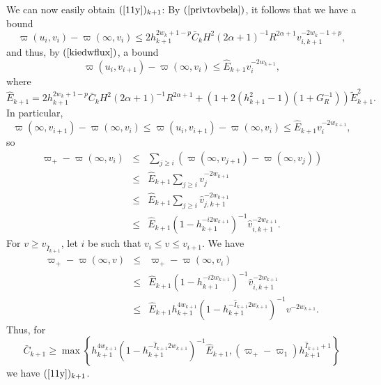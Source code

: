 \documentclass{article}
\begin{document}
We can now easily obtain $(\ref{11y})_{k+1}$:
By $(\ref{privtovbela})$, it follows that we have a bound
\[
\varpi(u_i,v_i)-\varpi(\infty,v_i)\le 
2h_{k+1}^{2w_k+1-p}\bar{C}_kH^2(2\alpha+1)^{-1}
R^{2\alpha+1}v_{i,k+1}^{-2w_k-1+p},
\]
and thus, by $(\ref{kiedwflux})$,
a bound
\begin{equation}
\label{giatoY}
\varpi(u_i,v_{i+1})-\varpi(\infty,v_i)
\le \hat{E}_{k+1} v_i^{-2w_{k+1}},
\end{equation}
where 
\[
\hat{E}_{k+1}=
2h_{k+1}^{2w_k+1-p}\bar{C}_kH^2(2\alpha+1)^{-1}
R^{2\alpha+1}+(1+2(h_{k+1}^2-1)(1+G_R^{-1}))
\tilde{E}_{k+1}^2.
\]
In particular, 
\[
\varpi(\infty,v_{i+1})-\varpi(\infty,v_i)\le
\varpi(u_i,v_{i+1})-\varpi(\infty,v_i)
\le \hat{E}_{k+1} v_i^{-2w_{k+1}}, 
\]
so
\begin{eqnarray*}
\varpi_+-\varpi(\infty,v_i)	&\le&	\sum_{j\ge i}
					 (\varpi(\infty,v_{j+1})-\varpi(\infty,v_j))\\
				&\le&	\hat{E}_{k+1}\sum_{j\ge i} v_j^{-2w_{k+1}}\\
				&\le&	\hat{E}_{k+1}\sum_{j\ge i} 
						\hat{v}_{j,k+1}^{-2w_{k+1}}\\
				&\le&	\hat{E}_{k+1}(1-h_{k+1}^{-i2w_{k+1}})^{-1}
						\hat{v}_{i,k+1}^{-2w_{k+1}}.
\end{eqnarray*}
For $v\ge v_{\hat{I}_{k+1}}$, let $i$ be such that $v_i\le v\le v_{i+1}$.
We have
\begin{eqnarray*}
\varpi_+-\varpi(\infty,v)	&\le& 	\varpi_+-\varpi(\infty, v_i)\\
				&\le&	\hat{E}_{k+1}\left(1-h_{k+1}^{-i2w_{k+1}}\right)
						^{-1}
						\hat{v}_{i,k+1}^{-2w_{k+1}}\\
				&\le&	\hat{E}_{k+1}h^{4w_{k+1}}_{k+1}
						\left(1-h_{k+1}^{-\hat{I}_{k+1}2w_{k+1}
						}\right)^{-1}
						v^{-2w_{k+1}}.
\end{eqnarray*}
Thus, for 
\[
\bar{C}_{k+1}\ge \max\left\{h^{4w_{k+1}}_{k+1}
\left(1-h_{k+1}^{-\hat{I}_{k+1}2w_{k+1}}\right)^{-1}\hat{E}_{k+1},
(\varpi_+-\varpi_1)h_{k+1}^{\hat{I}_{k+1}+1}\right\}
\]
we have
$(\ref{11y})_{k+1}$.
\end{document}
